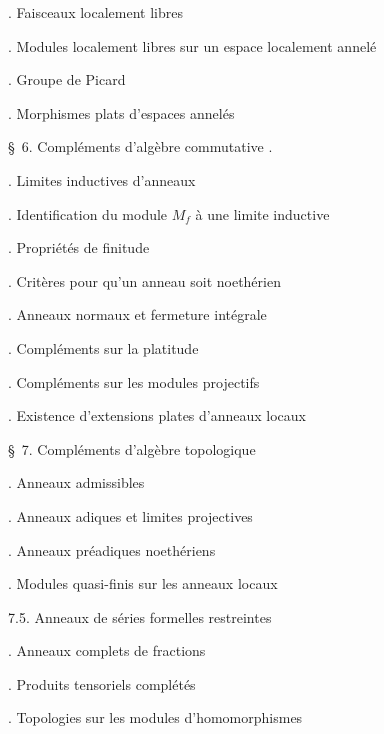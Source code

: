 \noindent{}. Faisceaux localement libres\dotfill

\noindent{}. Modules localement libres sur un espace localement annelé\dotfill

\noindent{}. Groupe de Picard\dotfill

\noindent{}. Morphismes plats d'espaces annelés\dotfill

\noindent\quad \S\ 6. Compléments d'algèbre commutative .

\noindent{}. Limites inductives d'anneaux\dotfill

\noindent{}. Identification du module $M_f$ à une limite  inductive\dotfill

\noindent{}. Propriétés de finitude\dotfill

\noindent{}. Critères pour qu'un anneau soit noethérien\dotfill

\noindent{}. Anneaux normaux et fermeture intégrale\dotfill

\noindent{}. Compléments sur la platitude\dotfill

\noindent{}. Compléments sur les modules projectifs\dotfill

\noindent{}. Existence d'extensions plates d'anneaux locaux\dotfill

\noindent\quad {}

\noindent\quad \S\ 7. Compléments d'algèbre topologique\dotfill

\noindent{}. Anneaux admissibles\dotfill

\noindent{}. Anneaux adiques et limites projectives\dotfill

\noindent{}. Anneaux préadiques noethériens\dotfill

\noindent{}. Modules quasi-finis sur les anneaux locaux\dotfill

\noindent\qquad {} 7.5. Anneaux de séries formelles restreintes\dotfill

\noindent{}. Anneaux complets de fractions\dotfill


\noindent{}. Produits tensoriels complétés\dotfill

\noindent{}. Topologies sur les modules d'homomorphismes\dotfill

